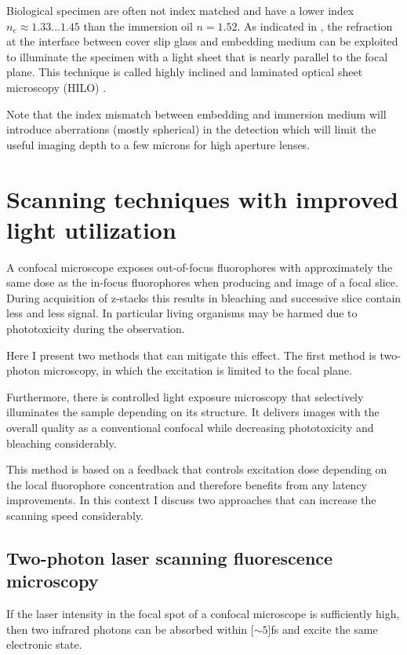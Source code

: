 
Biological specimen are often not index matched and have a lower index
$n_e\approx 1.33\ldots1.45$ than the immersion oil $n=1.52$. As
indicated in , the refraction at the interface
between cover slip glass and embedding medium can be exploited to
illuminate the specimen with a light sheet that is nearly parallel to
the focal plane.  This technique is called highly inclined and
laminated optical sheet microscopy (HILO) \citep{Tokunaga2008,
  Konopka2008}.


Note that the index mismatch between embedding and immersion medium
will introduce aberrations (mostly spherical) in the detection which
will limit the useful imaging depth to a few microns for high aperture
lenses.
\section{Scanning techniques with improved light utilization}
\begin{summary}
  A confocal microscope exposes out-of-focus fluorophores with
  approximately the same dose as the in-focus fluorophores when
  producing and image of a focal slice. During acquisition of z-stacks
  this results in bleaching and successive slice contain less and less
  signal. In particular living organisms may be harmed due to
  phototoxicity during the observation.

  Here I present two methods that can mitigate this effect. The first
  method is two-photon microscopy, in which the excitation is limited
  to the focal plane.

  Furthermore, there is controlled light exposure microscopy that
  selectively illuminates the sample depending on its structure. It
  delivers images with the overall quality as a conventional confocal
  while decreasing phototoxicity and bleaching considerably.

  This method is based on a feedback that controls excitation dose
  depending on the local fluorophore concentration and therefore
  benefits from any latency improvements. In this context I discuss
  two approaches that can increase the scanning speed considerably.
\end{summary}
\subsection{Two-photon laser scanning fluorescence microscopy}
\label{sec:2-photon}
If the laser intensity in the focal spot of a confocal microscope is
sufficiently high, then two infrared photons can be absorbed within
\unit[$\sim 5$]{fs} and excite the same electronic state.

